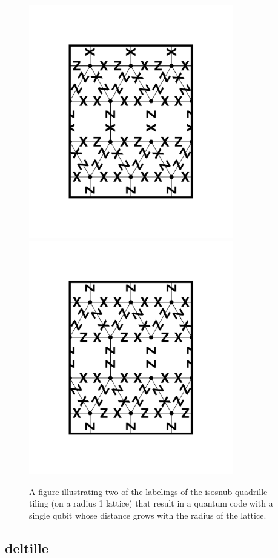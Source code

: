 \documentclass[12pt]{amsbook}
\theoremstyle{plain}
\theoremstyle{definition}
\theoremstyle{remark}
\begin{document}
\begin{figure}
\includegraphics[width=3.5in]{images/isosnub-quadrille-code-labeling-1} %
\includegraphics[width=3.5in]{images/isosnub-quadrille-code-labeling-2} %
\caption{
\label{figure:isosnub-quadrille-code-r-labeling}
A figure illustrating two of the labelings of the isosnub quadrille tiling (on a radius 1 lattice) that result in a quantum code with a single qubit whose distance grows with the radius of the lattice.
}
\end{figure}
\subsection{deltille}
\end{document}
